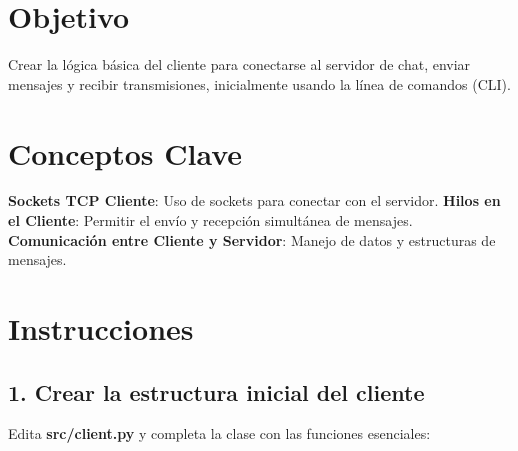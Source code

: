 \documentclass[
  a4paper,
  DIV=11,
  numbers=noendperiod,
  onepage,
  openany]{scrreprt}
\begin{document}
\section{Objetivo}\label{objetivo-3}

Crear la lógica básica del cliente para conectarse al servidor de chat,
enviar mensajes y recibir transmisiones, inicialmente usando la línea de
comandos (CLI).

\section{Conceptos Clave}\label{conceptos-clave-17}

\textbf{Sockets TCP Cliente}: Uso de sockets para conectar con el
servidor. \textbf{Hilos en el Cliente}: Permitir el envío y recepción
simultánea de mensajes. \textbf{Comunicación entre Cliente y Servidor}:
Manejo de datos y estructuras de mensajes.

\section{Instrucciones}\label{instrucciones-13}

\subsection{1. Crear la estructura inicial del
cliente}\label{crear-la-estructura-inicial-del-cliente}

Edita \textbf{src/client.py} y completa la clase con las funciones
esenciales:
\end{document}
